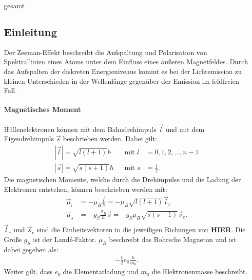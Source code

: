 gesamt\subsection{Einleitung}
Der Zeeman-Effekt beschreibt die Aufspaltung und Polarisation von Spektrallinien eines Atoms unter dem Einfluss eines äußeren Magnetfeldes.
Durch das Aufspalten der diskreten Energieniveaus kommt es bei der Lichtemission zu kleinen Unterschieden in der Wellenlänge gegenüber der Emission im feldfreien Fall.

\paragraph{Magnetisches Moment}
Hüllenelektronen können mit dem Bahndrehimpuls $\vec{l}$ und mit dem Eigendrehimpuls $\vec{s}$ beschrieben werden.
Dabei gilt:
\begin{align*}
  |\vec{l}|=\sqrt{l(l+1)}\hbar&& \text{mit } l &= 0,1,2,...,n-1\\
  |\vec{s}|=\sqrt{s(s+1)}\hbar&& \text{mit } s &= \frac{1}{2}.
\end{align*}
Die magnetischen Momente, welche durch die Drehimpulse und die Ladung der Elektronen entstehen, können beschrieben werden mit:
\begin{align*}
  \vec{\mu}_l &= -\mu_B \frac{\vec{l}}{\hbar} = -\mu_B \sqrt{l(l+1)}\vec{l}_e\\
  \vec{\mu}_s &= -g_S \frac{\mu_B}{\hbar}\vec{s} = -g_S \mu_B \sqrt{s(s+1)}\vec{s}_e.\\
\end{align*}
$\vec{l}_e$ und $\vec{s}_e$ sind die Einheitsvektoren in die jeweiligen Richungen von \textbf{\huge{HIER}}.
Die Größe $g_S$ ist der Landé-Faktor. $\mu_B$ beschreibt das Bohrsche Magneton und ist dabei gegeben als:
\begin{align*}
  -\frac{1}{2} e_0 \frac{\hbar}{m_0}.
\end{align*}
Weiter gilt, dass $e_0$ die Elementarladung und $m_0$ die Elektronenmasse beschreibt.

